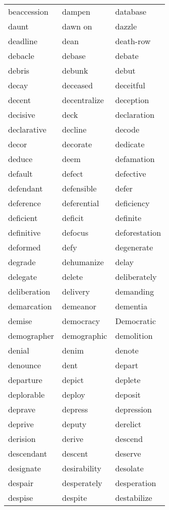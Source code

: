 \documentclass{minimal}
\begin{document}
\begin{longtable}{p{2.8cm}p{2.8cm}p{2.8cm}}
beaccession & dampen & database \\
daunt & dawn on & dazzle \\
deadline & dean & death-row \\
debacle & debase & debate \\
debris & debunk & debut \\
decay & deceased & deceitful \\
decent & decentralize & deception \\
decisive & deck & declaration \\
declarative & decline & decode \\
decor & decorate & dedicate \\
deduce & deem & defamation \\
default & defect & defective \\
defendant & defensible & defer \\
deference & deferential & deficiency \\
deficient & deficit & definite \\
definitive & defocus & deforestation \\
deformed & defy & degenerate \\
degrade & dehumanize & delay \\
delegate & delete & deliberately \\
deliberation & delivery & demanding \\
demarcation & demeanor & dementia \\
demise & democracy & Democratic \\
demographer & demographic & demolition \\
denial & denim & denote \\
denounce & dent & depart \\
departure & depict & deplete \\
deplorable & deploy & deposit \\
deprave & depress & depression \\
deprive & deputy & derelict \\
derision & derive & descend \\
descendant & descent & deserve \\
designate & desirability & desolate \\
despair & desperately & desperation \\
despise & despite & destabilize \\

\end{longtable}
\end{document}
